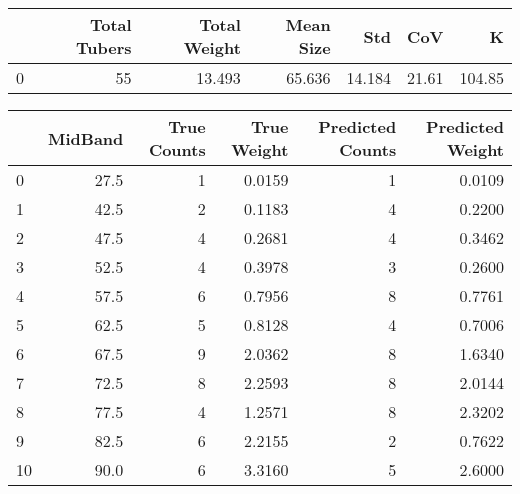 \begin{tabular}{lrrrrrr}
\toprule
{} &  Total Tubers &  Total Weight &  Mean Size &     Std &    CoV &       K \\
\midrule
0 &            55 &        13.493 &     65.636 &  14.184 &  21.61 &  104.85 \\
\bottomrule
\end{tabular}

\begin{tabular}{lrrrrr}
\toprule
{} &  MidBand &  True Counts &  True Weight &  Predicted Counts &  Predicted Weight \\
\midrule
0  &     27.5 &            1 &       0.0159 &                 1 &            0.0109 \\
1  &     42.5 &            2 &       0.1183 &                 4 &            0.2200 \\
2  &     47.5 &            4 &       0.2681 &                 4 &            0.3462 \\
3  &     52.5 &            4 &       0.3978 &                 3 &            0.2600 \\
4  &     57.5 &            6 &       0.7956 &                 8 &            0.7761 \\
5  &     62.5 &            5 &       0.8128 &                 4 &            0.7006 \\
6  &     67.5 &            9 &       2.0362 &                 8 &            1.6340 \\
7  &     72.5 &            8 &       2.2593 &                 8 &            2.0144 \\
8  &     77.5 &            4 &       1.2571 &                 8 &            2.3202 \\
9  &     82.5 &            6 &       2.2155 &                 2 &            0.7622 \\
10 &     90.0 &            6 &       3.3160 &                 5 &            2.6000 \\
\bottomrule
\end{tabular}

